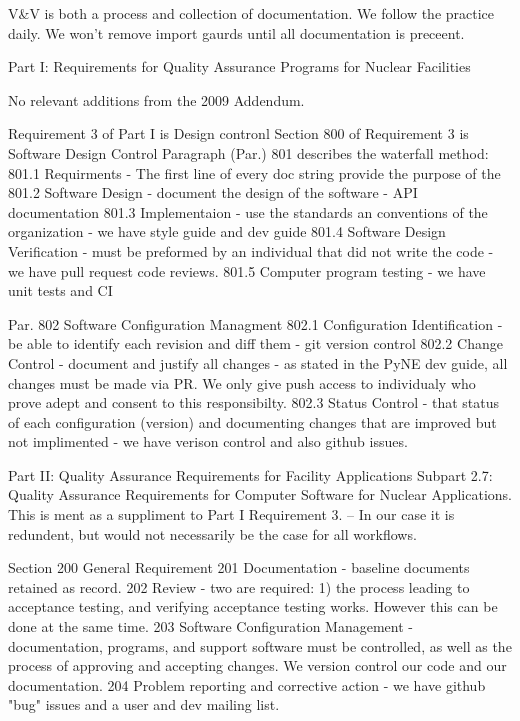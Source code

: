 \documentclass{anstrans}
\begin{document}
V\&V is both a process and collection of documentation. We follow the practice daily. We won't remove import gaurds until all documentation is preceent.

Part I: Requirements for Quality Assurance Programs for Nuclear Facilities

No relevant additions from the 2009 Addendum.

Requirement 3 of Part I is Design contronl
Section 800 of Requirement 3 is Software Design Control 
Paragraph (Par.) 801 describes the waterfall method:
801.1 Requirments - The first line of every doc string provide the purpose of the 
801.2 Software Design - document the design of the software - API documentation
801.3 Implementaion - use the standards an conventions of the organization - we have style guide and dev guide
801.4 Software Design Verification - must be preformed by an individual that did not write the code  - we have pull request code reviews.
801.5 Computer program testing - we have unit tests and CI

Par. 802 Software Configuration Managment
802.1 Configuration Identification - be able to identify each revision and diff them - git version control
802.2 Change Control - document and justify all changes - as stated in the PyNE dev guide, all changes must be made via PR. We only give push access to individualy who prove adept and consent to this responsibilty.
802.3 Status Control - that status of each configuration (version) and documenting changes that are improved but not implimented - we have verison control and also github issues.


Part II: Quality Assurance Requirements for Facility Applications
Subpart 2.7: Quality Assurance Requirements for Computer Software for Nuclear Applications.
This is ment as a suppliment to Part I Requirement 3. -- In our case it is redundent, but would not necessarily be the case for all workflows.

Section 200 General Requirement
201 Documentation - baseline documents retained as record.
202 Review  - two are required: 1) the process leading to acceptance testing, and verifying acceptance testing works. However this can be done at the same time.
203 Software Configuration Management - documentation, programs, and support software must be controlled, as well as the process of approving and accepting changes. We version control our code and our documentation.
204 Problem reporting and corrective action - we have github "bug" issues and a user and dev mailing list.
\end{document}
